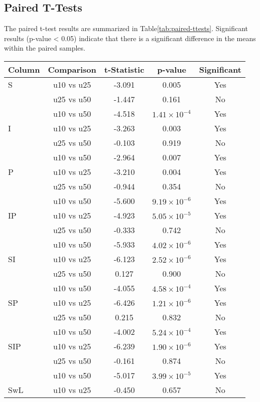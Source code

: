 \documentclass{article}
\begin{document}
\subsection{Paired T-Tests}
The paired t-test results are summarized in Table\ref{tab:paired-ttests}. Significant results (p-value < 0.05) indicate that there is a significant difference in the means within the paired samples.

\begin{table}[ht!]
\centering
\begin{tabular}{lcccc}
\toprule
Column & Comparison & t-Statistic & p-value & Significant \\
\midrule
S   & u10 vs u25 & -3.091 & 0.005 & Yes \\
    & u25 vs u50 & -1.447 & 0.161 & No \\
    & u10 vs u50 & -4.518 & $1.41 \times 10^{-4}$ & Yes \\
I   & u10 vs u25 & -3.263 & 0.003 & Yes \\
    & u25 vs u50 & -0.103 & 0.919 & No \\
    & u10 vs u50 & -2.964 & 0.007 & Yes \\
P   & u10 vs u25 & -3.210 & 0.004 & Yes \\
    & u25 vs u50 & -0.944 & 0.354 & No \\
    & u10 vs u50 & -5.600 & $9.19 \times 10^{-6}$ & Yes \\
IP  & u10 vs u25 & -4.923 & $5.05 \times 10^{-5}$ & Yes \\
    & u25 vs u50 & -0.333 & 0.742 & No \\
    & u10 vs u50 & -5.933 & $4.02 \times 10^{-6}$ & Yes \\
SI  & u10 vs u25 & -6.123 & $2.52 \times 10^{-6}$ & Yes \\
    & u25 vs u50 & 0.127  & 0.900 & No \\
    & u10 vs u50 & -4.055 & $4.58 \times 10^{-4}$ & Yes \\
SP  & u10 vs u25 & -6.426 & $1.21 \times 10^{-6}$ & Yes \\
    & u25 vs u50 & 0.215  & 0.832 & No \\
    & u10 vs u50 & -4.002 & $5.24 \times 10^{-4}$ & Yes \\
SIP & u10 vs u25 & -6.239 & $1.90 \times 10^{-6}$ & Yes \\
    & u25 vs u50 & -0.161 & 0.874 & No \\
    & u10 vs u50 & -5.017 & $3.99 \times 10^{-5}$ & Yes \\
SwL & u10 vs u25 & -0.450 & 0.657 & No \\

\end{tabular}
\end{table}
\end{document}
